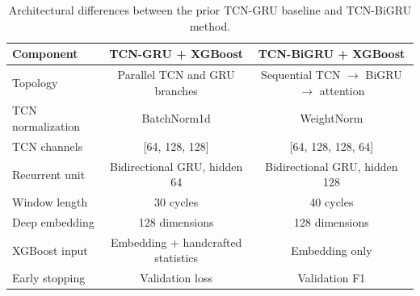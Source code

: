 \begin{table}[!t]
\centering
\caption{Architectural differences between the prior TCN-GRU baseline and TCN-BiGRU method.}
\label{tab:architecture\_comparison}
\begin{tabular}{lcc}
\hline
Component & TCN-GRU + XGBoost & TCN-BiGRU + XGBoost \\
\hline
Topology & Parallel TCN and GRU branches & Sequential TCN $\rightarrow$ BiGRU $\rightarrow$ attention \\
TCN normalization & BatchNorm1d & WeightNorm \\
TCN channels & [64, 128, 128] & [64, 128, 128, 64] \\
Recurrent unit & Bidirectional GRU, hidden 64 & Bidirectional GRU, hidden 128 \\
Window length & 30 cycles & 40 cycles \\
Deep embedding & 128 dimensions & 128 dimensions \\
XGBoost input & Embedding + handcrafted statistics & Embedding only \\
Early stopping & Validation loss & Validation F1 \\
\hline
\end{tabular}
\end{table}
